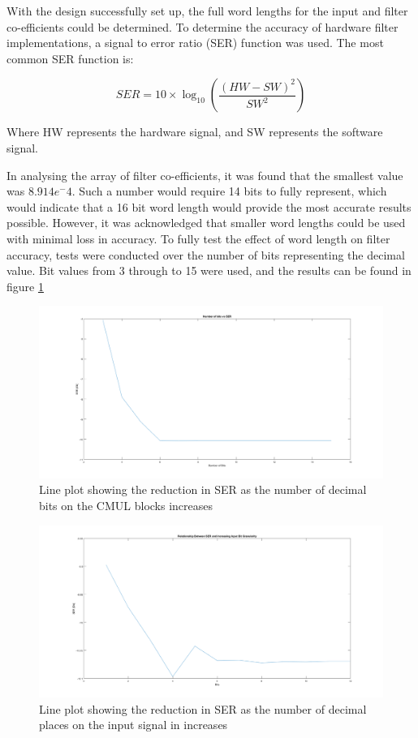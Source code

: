 \documentclass[12pt,a4paper]{article}
\begin{document}
With the design successfully set up, the full word lengths for the input and filter co-efficients could be determined. To determine the accuracy of hardware filter implementations, a signal to error ratio (SER) function was used. The most common SER function is:

\[SER = 10\times \log_{10}(\frac{(HW-SW)^2}{SW^2})\]

Where HW represents the hardware signal, and SW represents the software signal. 

In analysing the array of filter co-efficients, it was found that the smallest value was $8.914e^-4$. Such a number would require 14 bits to fully represent, which would indicate that a 16 bit word length would provide the most accurate results possible. However, it was acknowledged that smaller word lengths could be used with minimal loss in accuracy. To fully test the effect of word length on filter accuracy, tests were conducted over the number of bits representing the decimal value. Bit values from 3 through to 15 were used, and the results can be found in figure \ref{fig:bits_selecting}

\begin{figure}[H]
    \centering
    \includegraphics[scale=0.25]{images/bits_selecting.png}
    \caption{Line plot showing the reduction in SER as the number of decimal bits on the CMUL blocks increases}
    \label{fig:bits_selecting}
\end{figure}

\begin{figure}[H]
    \centering
    \includegraphics[scale=0.25]{images/bits_input.png}
    \caption{Line plot showing the reduction in SER as the number of decimal places on the input signal in increases}
    \label{fig:bits_input}
\end{figure}
\end{document}
